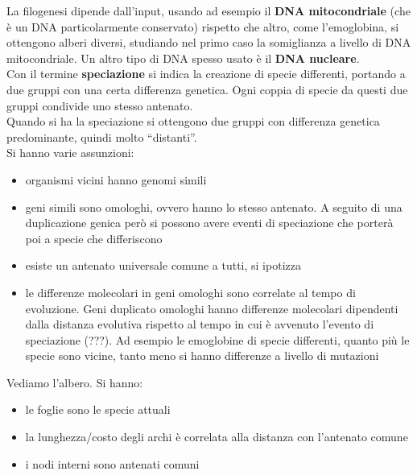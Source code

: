 \documentclass[a4paper,12pt, oneside]{book}
\begin{document}
La filogenesi dipende dall'input, usando ad esempio il \textbf{DNA
  mitocondriale} (che è 
un DNA particolarmente conservato) rispetto che altro, come l'emoglobina, si
ottengono alberi 
diversi, studiando nel primo caso la somiglianza a livello di DNA
mitocondriale. Un altro tipo di DNA spesso usato è il \textbf{DNA nucleare}.\\
Con il termine \textbf{speciazione} si indica la creazione di specie differenti,
portando a due gruppi con una certa differenza genetica. Ogni coppia di specie
da questi due gruppi condivide uno stesso antenato.\\
Quando si ha la speciazione si ottengono due gruppi con differenza genetica
predominante, quindi molto ``distanti''.\\ 
Si hanno varie assunzioni:
\begin{itemize}
  \item organismi vicini hanno genomi simili
  \item geni simili sono omologhi, ovvero hanno lo stesso antenato. A seguito di
  una duplicazione genica però si possono avere eventi di speciazione che
  porterà poi a specie che differiscono
  \item esiste un antenato universale comune a tutti, si ipotizza
  \item le differenze molecolari in geni omologhi sono correlate al tempo di
  evoluzione. Geni duplicato omologhi hanno differenze molecolari dipendenti
  dalla distanza evolutiva rispetto al tempo in cui è avvenuto l'evento di
  speciazione (???). Ad esempio le emoglobine di specie differenti, quanto più
  le specie sono vicine, tanto meno si hanno differenze a livello di
  mutazioni
\end{itemize}
Vediamo l'albero. Si hanno:
\begin{itemize}
  \item le foglie sono le specie attuali
  \item la lunghezza/costo degli archi è correlata alla distanza con l'antenato
  comune 
  \item i nodi interni sono antenati comuni
\end{itemize}
\end{document}

